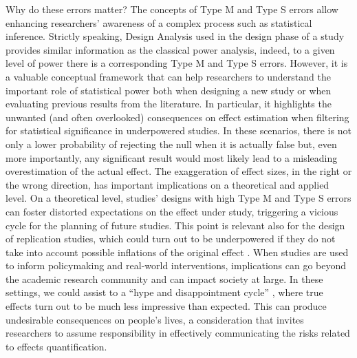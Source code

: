 \documentclass{article}\usepackage[]{graphicx}\usepackage[]{color}
\begin{document}
Why do these errors matter? The concepts of Type M and Type S errors allow enhancing researchers’ awareness of a complex process such as statistical inference. Strictly speaking, Design Analysis used in the design phase of a study provides similar information as the classical power analysis, indeed, to a given level of power there is a corresponding Type M and Type S errors. However, it is a valuable conceptual framework that can help researchers to understand the important role of statistical power both when designing a new study or when evaluating previous results from the literature. In particular, it highlights the unwanted (and often overlooked) consequences on effect estimation when filtering for statistical significance in underpowered studies. In these scenarios, there is not only a lower probability of rejecting the null when it is actually false but, even more importantly, any significant result would most likely lead to a misleading overestimation of the actual effect. The exaggeration of effect sizes, in the right or the wrong direction, has important implications on a theoretical and applied level. On a theoretical level, studies’ designs with high Type M and Type S errors can foster distorted expectations on the effect under study, triggering a vicious cycle for the planning of future studies. This point is relevant also for the design of replication studies, which could turn out to be underpowered if they do not take into account possible inflations of the original effect \parencite{buttonPowerFailureWhy2013}. When studies are used to inform policymaking and real-world interventions, implications can go beyond the academic research community and can impact society at large. In these settings, we could assist to a “hype and disappointment cycle” \parencite{gelmanOverconfidenceResearchCertainty2019}, where true effects turn out to be much less impressive than expected. This can produce undesirable consequences on people’s lives, a consideration that invites researchers to assume responsibility in effectively communicating the risks related to effects quantification.
\end{document}
